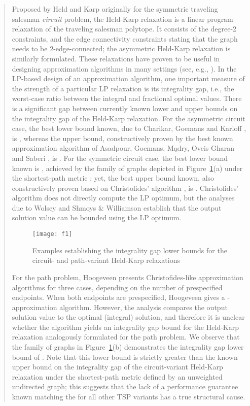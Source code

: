 \documentclass[11pt,letterpaper]{article}
\begin{document}
\begin{quote}
Proposed by Held and Karp \cite{HK} originally for the symmetric traveling salesman \emph{circuit} problem, the Held-Karp relaxation is a linear program relaxation of the traveling salesman polytope. It consists of the degree-2 constraints, and the edge connectivity constraints stating that the graph needs to be 2-edge-connected; the asymmetric Held-Karp relaxation is similarly formulated. These relaxations have proven to be useful in designing approximation algorithms in many settings (see, e.g., \cite{AGMOS, AKS, OSS, MS}). In the LP-based design of an approximation algorithm, one important measure of the strength of a particular LP relaxation is its integrality gap, i.e., the worst-case ratio between the integral and fractional optimal values. There is a significant gap between currently known lower and upper bounds on the integrality gap of the Held-Karp relaxation. For the asymmetric circuit case, the best lower bound known, due to Charikar, Goemans and Karloff \cite{CGK}, is , whereas the upper bound, constructively proven by the best known approximation algorithm of Asadpour, Goemans, M{\k{a}}dry, Oveis Gharan and Saberi \cite{AGMOS}, is . For the symmetric circuit case, the best lower bound known is , achieved by the family of graphs depicted in Figure~\mbox{\ref{f:1}(a)} under the shortest-path metric \cite{G}; yet, the best upper bound known, also constructively proven \cite{W, SW} based on Christofides' algorithm \cite{C}, is . Christofides' algorithm does not directly compute the LP optimum, but the analyses due to Wolsey \cite{W} and Shmoys \& Williamson \cite{SW} establish that the output solution value can be bounded using the LP optimum. 

\begin{figure}
\label{f:1}
\center
\texttt{[image: f1]}
\caption{Examples establishing the integrality gap lower bounds for the circuit- and path-variant Held-Karp relaxations}
\end{figure}

For the path problem, Hoogeveen \cite{H} presents Christofides-like approximation algorithms for three cases, depending on the number of prespecified endpoints.  When both endpoints are prespecified, Hoogeveen \cite{H} gives a -approximation algorithm. However, the analysis compares the output solution value to the optimal (integral) solution, and therefore it is unclear whether the algorithm yields an integrality gap bound for the Held-Karp relaxation analogously formulated for the path problem. We observe that the family of graphs in Figure~\mbox{\ref{f:1}(b)} demonstrates the integrality gap lower bound of . Note that this lower bound is strictly greater than the known upper bound on the integrality gap of the circuit-variant Held-Karp relaxation under the shortest-path metric defined by an unweighted undirected graph; this suggests that the lack of a performance guarantee known matching the  for all other TSP variants has a true structural cause.


\end{quote}
\end{document}
